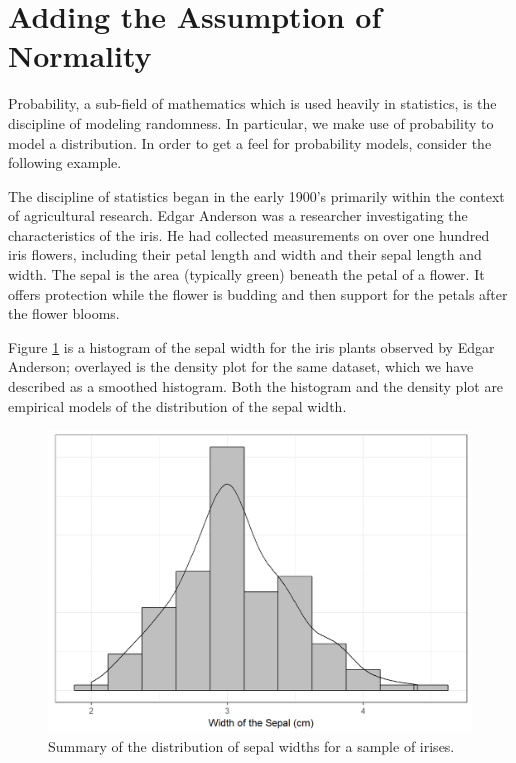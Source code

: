 \documentclass[]{book}
\theoremstyle{plain}
\theoremstyle{mydefn}
\theoremstyle{myexmpl}
\theoremstyle{remark}
\let\BeginKnitrBlock\begin \let\EndKnitrBlock\end
\let\BeginKnitrBlock\begin \let\EndKnitrBlock\end
\begin{document}
\section{Adding the Assumption of
Normality}\label{adding-the-assumption-of-normality}

Probability, a sub-field of mathematics which is used heavily in
statistics, is the discipline of modeling randomness. In particular, we
make use of probability to model a distribution. In order to get a feel
for probability models, consider the following example.

\BeginKnitrBlock{example}[Iris Characteristics]
\protect\hypertarget{exm:ex-iris}{}{\label{exm:ex-iris} {} }The discipline of statistics began in the early
1900's primarily within the context of agricultural research. Edgar
Anderson was a researcher investigating the characteristics of the iris.
He had collected measurements on over one hundred iris flowers,
including their petal length and width and their sepal length and width.
The sepal is the area (typically green) beneath the petal of a flower.
It offers protection while the flower is budding and then support for
the petals after the flower blooms.
\EndKnitrBlock{example}

Figure \ref{fig:regconditions-iris-histogram} is a histogram of the
sepal width for the iris plants observed by Edgar Anderson; overlayed is
the density plot for the same dataset, which we have described as a
smoothed histogram. Both the histogram and the density plot are
empirical models of the distribution of the sepal width.

\begin{figure}

{\centering \includegraphics[width=0.8\linewidth]{./Images/regconditions-iris-histogram-1} 

}

\caption{Summary of the distribution of sepal widths for a sample of irises.}\label{fig:regconditions-iris-histogram}
\end{figure}
\end{document}
